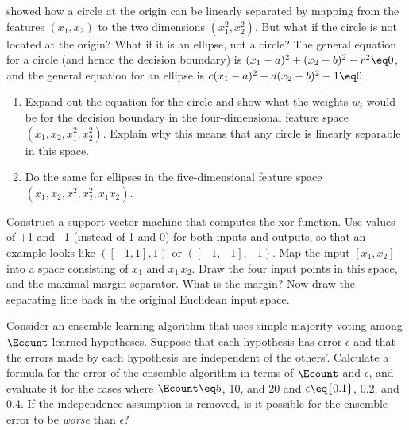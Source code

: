 
\begin{exercise}
   showed how a circle at the origin can
be linearly separated by mapping from the features \((x_1, x_2)\) to the
two dimensions \((x_1^2, x_2^2)\).  But what if the circle is not located
at the origin? What if it is an ellipse, not a circle?  The general
equation for a circle (and hence the decision boundary) is \((x_1-a)^2 +
(x_2-b)^2 - r^2\eq 0\), and the general equation for an ellipse is \(c(x_1-a)^2 + d(x_2-b)^2 - 1 \eq 0\).
\begin{enumerate}
  \item Expand out the equation for the circle and show what the weights \(w_i\)
  would be for the decision boundary in the four-dimensional feature 
  space \((x_1, x_2, x_1^2, x_2^2)\).
  Explain why this means that any circle is linearly separable in this space.
  \item Do the same for ellipses in the five-dimensional 
   feature space \((x_1, x_2, x_1^2, x_2^2, x_1 x_2)\).
\end{enumerate}
\end{exercise} 

\begin{exercise}
Construct a support vector machine that computes the {\sc xor} function.  
Use values of +1 and --1 (instead of 1 and 0) for both inputs and
outputs, so that an example looks like \(([-1, 1],
1)\) or \(([-1, -1], -1)\).  Map the input \([x_1,x_2]\) into a
space consisting of
\(x_1\) and \(x_1\,x_2\).  Draw the four input points in this space, and
the maximal margin separator.  What is the margin?  Now draw the separating
line back in the original Euclidean input space.
\end{exercise} 



\begin{exercise}
Consider an ensemble learning algorithm that uses simple majority
voting among \({\Ecount}\) learned hypotheses.  Suppose that each hypothesis has
error \(\epsilon\) and that the errors made by each hypothesis are
independent of the others'. Calculate a formula for the error of the
ensemble algorithm in terms of \({\Ecount}\) and \(\epsilon\), and evaluate it for
the cases where \({\Ecount}\eq 5\), 10, and 20 and \(\epsilon\eq {0.1}\), 0.2, and
0.4. If the independence assumption is removed, is it possible for the
ensemble error to be {\em worse} than \(\epsilon\)?
\end{exercise} 


